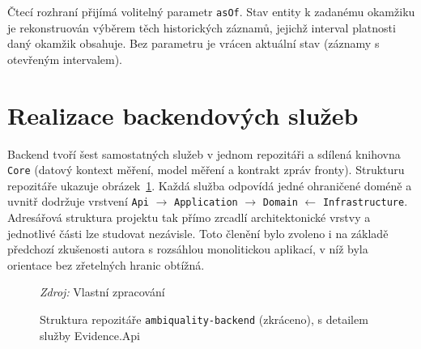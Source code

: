 Čtecí rozhraní přijímá volitelný parametr \texttt{asOf}. Stav entity k zadanému okamžiku je rekonstruován výběrem těch historických záznamů, jejichž interval platnosti daný okamžik obsahuje. Bez parametru je vrácen aktuální stav (záznamy s otevřeným intervalem).

\section{Realizace backendových služeb}

Backend tvoří šest samostatných služeb v jednom repozitáři a sdílená knihovna \texttt{Core} (datový kontext měření, model měření a kontrakt zpráv fronty). Strukturu repozitáře ukazuje obrázek~\ref{fig:dirtree}. Každá služba odpovídá jedné ohraničené doméně a uvnitř dodržuje vrstvení \texttt{Api} $\rightarrow$ \texttt{Application} $\rightarrow$ \texttt{Domain} $\leftarrow$ \texttt{Infrastructure}. Adresářová struktura projektu tak přímo zrcadlí architektonické vrstvy a jednotlivé části lze studovat nezávisle. Toto členění bylo zvoleno i na základě předchozí zkušenosti autora s rozsáhlou monolitickou aplikací, v níž byla orientace bez zřetelných hranic obtížná.

\begin{figure}[htbp]
\caption{Struktura repozitáře \texttt{ambiquality-backend} (zkráceno), s detailem služby Evidence.Api}
\label{fig:dirtree}
\medskip
{\small
{}}
\medskip

{\footnotesize \textit{Zdroj:} Vlastní zpracování}
\end{figure}

